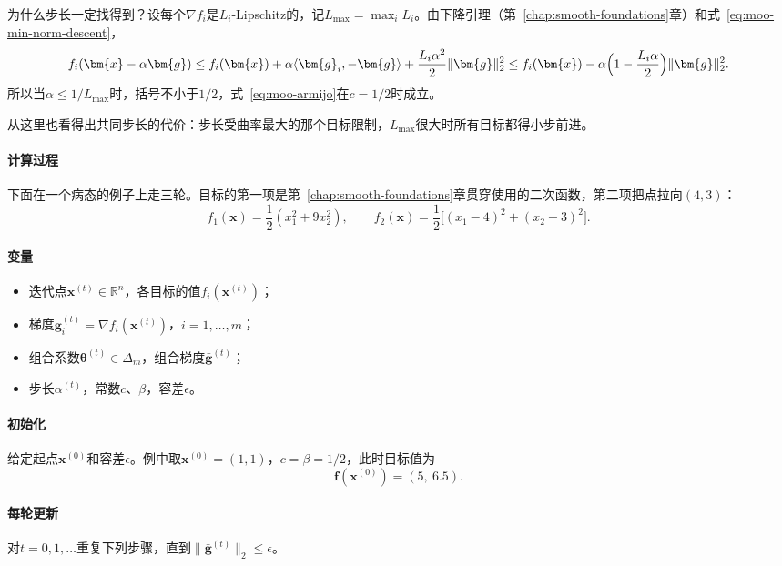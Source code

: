 为什么步长一定找得到？设每个$\nabla f_i$是$L_i$-Lipschitz的，记$L_{\max}=\max_iL_i$。由下降引理（第~\ref{chap:smooth-foundations}章）和式~\eqref{eq:moo-min-norm-descent}，
\[
 f_i(\bm{x}-\alpha\bar{\bm{g}})
 \leq f_i(\bm{x})+\alpha\langle\bm{g}_i,-\bar{\bm{g}}\rangle+\frac{L_i\alpha^2}{2}\lVert\bar{\bm{g}}\rVert_2^2
 \leq f_i(\bm{x})-\alpha\Bigl(1-\frac{L_i\alpha}{2}\Bigr)\lVert\bar{\bm{g}}\rVert_2^2.
\]
所以当$\alpha\leq1/L_{\max}$时，括号不小于$1/2$，式~\eqref{eq:moo-armijo}在$c=1/2$时成立。

从这里也看得出共同步长的代价：步长受曲率最大的那个目标限制，$L_{\max}$很大时所有目标都得小步前进。

\paragraph{计算过程}
下面在一个病态的例子上走三轮。目标的第一项是第~\ref{chap:smooth-foundations}章贯穿使用的二次函数，第二项把点拉向$(4,3)$：
\begin{equation}
 f_1(\bm{x})=\frac12(x_1^2+9x_2^2),\qquad
 f_2(\bm{x})=\frac12\bigl[(x_1-4)^2+(x_2-3)^2\bigr].
 \label{eq:moo-mgda-example}
\end{equation}

\paragraph{变量}
\begin{itemize}
 \item 迭代点$\bm{x}^{(t)}\in\mathbb{R}^n$，各目标的值$f_i(\bm{x}^{(t)})$；
 \item 梯度$\bm{g}_i^{(t)}=\nabla f_i(\bm{x}^{(t)})$，$i=1,\ldots,m$；
 \item 组合系数$\bm{\theta}^{(t)}\in\Delta_m$，组合梯度$\bar{\bm{g}}^{(t)}$；
 \item 步长$\alpha^{(t)}$，常数$c$、$\beta$，容差$\epsilon$。
\end{itemize}

\paragraph{初始化}
给定起点$\bm{x}^{(0)}$和容差$\epsilon$。例中取$\bm{x}^{(0)}=(1,1)$，$c=\beta=1/2$，此时目标值为
\[
 \bm{f}(\bm{x}^{(0)})=(5,\ 6.5).
\]

\paragraph{每轮更新}
对$t=0,1,\ldots$重复下列步骤，直到$\lVert\bar{\bm{g}}^{(t)}\rVert_2\leq\epsilon$。

